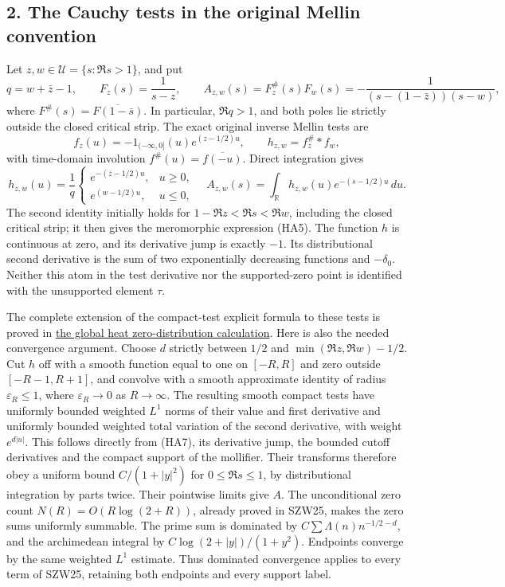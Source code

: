 \documentclass[
  10pt,
  a4paper,
]{article}
\begin{document}
\subsection{2. The Cauchy tests in the original Mellin
convention}\label{the-cauchy-tests-in-the-original-mellin-convention}

Let \(z,w\in\mathcal U=\{s:\Re s>1\}\), and put \[
q=w+\bar z-1,\qquad F_z(s)=\frac1{s-z},\qquad
A_{z,w}(s)=F_z^\#(s)F_w(s)
=-\frac1{(s-(1-\bar z))(s-w)},
\tag{HA5}
\] where \(F^\#(s)=\overline{F(1-\bar s)}\). In particular, \(\Re q>1\),
and both poles lie strictly outside the closed critical strip. The exact
original inverse Mellin tests are \[
f_z(u)=-1_{(-\infty,0]}(u)e^{(z-1/2)u},\qquad
h_{z,w}=f_z^\#*f_w,
\tag{HA6}
\] with time-domain involution \(f^\#(u)=\overline{f(-u)}\). Direct
integration gives \[
h_{z,w}(u)=\frac1q
\begin{cases}
e^{-(\bar z-1/2)u},&u\ge0,\\
e^{(w-1/2)u},&u\le0,
\end{cases}
\quad
A_{z,w}(s)=\int_{\mathbb R}h_{z,w}(u)e^{-(s-1/2)u}\,du.
\tag{HA7}
\] The second identity initially holds for \(1-\Re z<\Re s<\Re w\),
including the closed critical strip; it then gives the meromorphic
expression (HA5). The function \(h\) is continuous at zero, and its
derivative jump is exactly \(-1\). Its distributional second derivative
is the sum of two exponentially decreasing functions and \(-\delta_0\).
Neither this atom in the test derivative nor the supported-zero point is
identified with the unsupported element \(\tau\).

The complete extension of the compact-test explicit formula to these
tests is proved in \href{ACTUAL_HEAT_ZERO_DISTRIBUTION_VARIATION.md}{the
global heat zero-distribution calculation}. Here is also the needed
convergence argument. Choose \(d\) strictly between \(1/2\) and
\(\min(\Re z,\Re w)-1/2\). Cut \(h\) off with a smooth function equal to
one on \([-R,R]\) and zero outside \([-R-1,R+1]\), and convolve with a
smooth approximate identity of radius \(\varepsilon_R\le1\), where
\(\varepsilon_R\to0\) as \(R\to\infty\). The resulting smooth compact
tests have uniformly bounded weighted \(L^1\) norms of their value and
first derivative and uniformly bounded weighted total variation of the
second derivative, with weight \(e^{d|u|}\). This follows directly from
(HA7), its derivative jump, the bounded cutoff derivatives and the
compact support of the mollifier. Their transforms therefore obey a
uniform bound \(C/(1+|y|^2)\) for \(0\le\Re s\le1\), by distributional
integration by parts twice. Their pointwise limits give \(A\). The
unconditional zero count \(N(R)=O(R\log(2+R))\), already proved in
SZW25, makes the zero sums uniformly summable. The prime sum is
dominated by \(C\sum\Lambda(n)n^{-1/2-d}\), and the archimedean integral
by \(C\log(2+|y|)/(1+y^2)\). Endpoints converge by the same weighted
\(L^1\) estimate. Thus dominated convergence applies to every term of
SZW25, retaining both endpoints and every support label.
\end{document}
